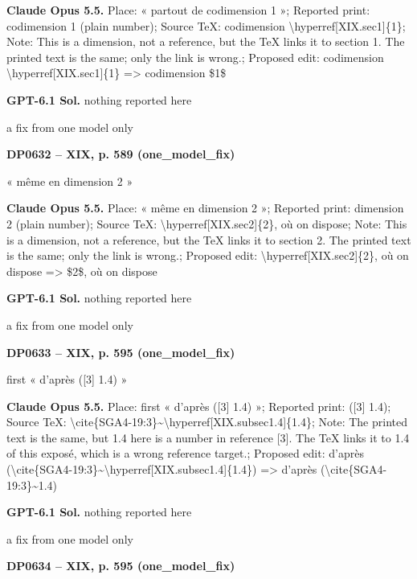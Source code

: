 \textbf{Claude Opus 5.5.} Place: « partout de codimension 1 »; Reported print: codimension 1 (plain number); Source TeX: codimension \textbackslash{}hyperref[XIX.sec1]\{1\}; Note: This is a dimension, not a reference, but the TeX links it to section 1. The printed text is the same; only the link is wrong.; Proposed edit: codimension \textbackslash{}hyperref[XIX.sec1]\{1\} =\allowbreak > codimension \$1\$\par
\textbf{GPT-6.1 Sol.} nothing reported here\par
a fix from one model only\par
\par\noindent\hypertarget{DP0632}{}\textbf{DP0632 -- XIX, p. 589 (one\_model\_fix)}\par
« même en dimension 2 »\par
\textbf{Claude Opus 5.5.} Place: « même en dimension 2 »; Reported print: dimension 2 (plain number); Source TeX: \textbackslash{}hyperref[XIX.sec2]\{2\}, où on dispose; Note: This is a dimension, not a reference, but the TeX links it to section 2. The printed text is the same; only the link is wrong.; Proposed edit: \textbackslash{}hyperref[XIX.sec2]\{2\}, où on dispose =\allowbreak > \$2\$, où on dispose\par
\textbf{GPT-6.1 Sol.} nothing reported here\par
a fix from one model only\par
\par\noindent\hypertarget{DP0633}{}\textbf{DP0633 -- XIX, p. 595 (one\_model\_fix)}\par
first « d'après ([3] 1.4) »\par
\textbf{Claude Opus 5.5.} Place: first « d'après ([3] 1.4) »; Reported print: ([3] 1.4); Source TeX: \textbackslash{}cite\{SGA4-19:3\}\textasciitilde{}\textbackslash{}hyperref[XIX.subsec1.4]\{1.4\}; Note: The printed text is the same, but 1.4 here is a number in reference [3]. The TeX links it to 1.4 of this exposé, which is a wrong reference target.; Proposed edit: d'après (\textbackslash{}cite\{SGA4-19:3\}\textasciitilde{}\textbackslash{}hyperref[XIX.subsec1.4]\{1.4\}) =\allowbreak > d'après (\textbackslash{}cite\{SGA4-19:3\}\textasciitilde{}1.4)\par
\textbf{GPT-6.1 Sol.} nothing reported here\par
a fix from one model only\par
\par\noindent\hypertarget{DP0634}{}\textbf{DP0634 -- XIX, p. 595 (one\_model\_fix)}\par
